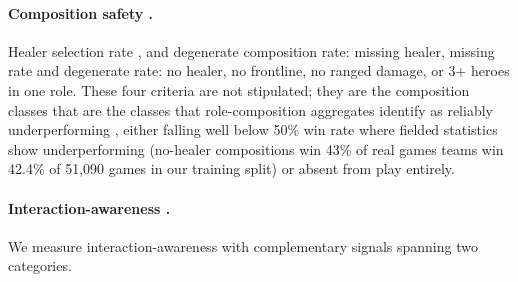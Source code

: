 \documentclass[journal]{IEEEtran}
\providecommand{\DIFaddtex}[1]{{\protect\color{blue} \sf #1}} %
\providecommand{\DIFdeltex}[1]{{\protect\color{red} \scriptsize #1}} %
\providecommand{\DIFaddbegin}{} %
\providecommand{\DIFaddend}{} %
\providecommand{\DIFdelbegin}{} %
\providecommand{\DIFdelend}{} %
\providecommand{\DIFadd}[1]{\texorpdfstring{\DIFaddtex{#1}}{#1}} %
\providecommand{\DIFdel}[1]{\texorpdfstring{\DIFdeltex{#1}}{}} %
\begin{document}
\DIFdelend \paragraph{Composition safety\DIFdelbegin \DIFdel{.}\DIFdelend } Healer \DIFdelbegin \DIFdel{selection rate , and degenerate composition rate: missing healer, missing }\DIFdelend \DIFaddbegin \DIFadd{rate and degenerate rate: no healer, no }\DIFaddend frontline, no ranged damage, or 3+ heroes in one role. These \DIFdelbegin \DIFdel{four criteria are not stipulated; they are the composition classes that }\DIFdelend \DIFaddbegin \DIFadd{are }\DIFaddend the \DIFaddbegin \DIFadd{classes that }\DIFaddend role-composition \DIFdelbegin \DIFdel{aggregates identify as reliably underperforming , either falling well below 50\% win rate where fielded }\DIFdelend \DIFaddbegin \DIFadd{statistics show underperforming }\DIFaddend (no-healer \DIFdelbegin \DIFdel{compositions win 43\% of real games }\DIFdelend \DIFaddbegin \DIFadd{teams win 42.4\% of 51,090 games in our training split}\DIFaddend ) or absent from play\DIFdelbegin \DIFdel{entirely}\DIFdelend .

\paragraph{Interaction-awareness\DIFdelbegin \DIFdel{.}\DIFdelend } \DIFdelbegin \DIFdel{We measure interaction-awareness with complementary signals spanning two categories.
}%
\end{document}

